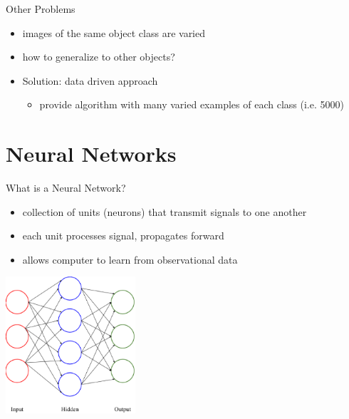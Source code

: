 \documentclass{beamer}
\begin{document}
  \begin{frame}{Other Problems}
    \begin{itemize}
      \item images of the same object class are varied
      \item how to generalize to other objects?
      \item Solution: data driven approach
      \begin{itemize}
        \item provide algorithm with many varied examples of each class (i.e. 5000)
      \end{itemize}
    \end{itemize}
  \end{frame}

  \section{Neural Networks}
  \begin{frame}{What is a Neural Network?}
    \begin{itemize}
      \item collection of units (neurons) that transmit signals to one another
      \item each unit processes signal, propagates forward
      \item allows computer to learn from observational data
    \end{itemize}
    \begin{center}
      \includegraphics[height=2in]{../figures/neural_network.eps}
    \end{center}
  \end{frame}
\end{document}
